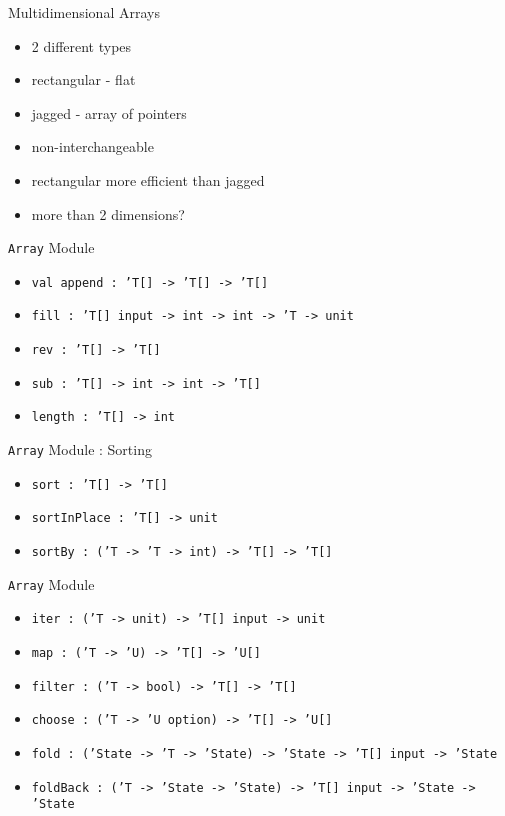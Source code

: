 \documentclass{beamer}
\begin{document}
\begin{frame}{Multidimensional Arrays}
  \begin{itemize}[<+->]
    \item 2 different types
    \item rectangular - flat
    \item jagged - array of pointers
    \item non-interchangeable
    \item rectangular more efficient than jagged
    \item more than 2 dimensions?
  \end{itemize}
\end{frame}

\begin{frame}{\texttt{Array} Module}
  \begin{itemize}
    \item \texttt{val append : 'T[] -> 'T[] -> 'T[]}
    \item \texttt{fill : 'T[] input -> int -> int -> 'T -> unit}
    \item \texttt{rev : 'T[] -> 'T[]}
    \item \texttt{sub : 'T[] -> int -> int -> 'T[]}
    \item \texttt{length : 'T[] -> int}
  \end{itemize}
\end{frame}

\begin{frame}{\texttt{Array} Module : Sorting}
  \begin{itemize}
    \item \texttt{sort : 'T[] -> 'T[]}
    \item \texttt{sortInPlace : 'T[] -> unit}
    \item \texttt{sortBy : ('T -> 'T -> int) -> 'T[] -> 'T[]}
  \end{itemize}
\end{frame}

\begin{frame}{\texttt{Array} Module}
  \begin{itemize}
    \item \texttt{iter : ('T -> unit) -> 'T[] input -> unit}
    \item \texttt{map : ('T -> 'U) -> 'T[] -> 'U[]}
    \item \texttt{filter : ('T -> bool) -> 'T[] -> 'T[]}
    \item \texttt{choose : ('T -> 'U option) -> 'T[] -> 'U[]}
    \item \texttt{fold : ('State -> 'T -> 'State) -> 'State -> 'T[] input -> 'State}
    \item \texttt{foldBack : ('T -> 'State -> 'State) -> 'T[] input -> 'State -> 'State}
  \end{itemize}
\end{frame}
\end{document}
